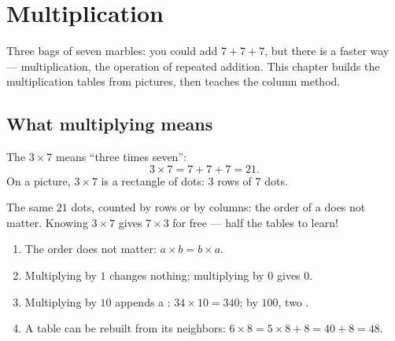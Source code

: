 \chapter{Multiplication}\label{ch:g3:mult}

Three bags of seven marbles: you could add $7 + 7 + 7$, but there is
a faster way --- multiplication, the operation of repeated addition.
This chapter builds the multiplication tables from pictures, then
teaches the column method.

\section{What multiplying means}

\begin{definition}[Multiplication]\label{def:g3:mult:def}
The  $3 \times 7$ means ``three times seven'':
\[
3 \times 7 = 7 + 7 + 7 = 21 .
\]
On a picture, $3 \times 7$ is a rectangle of dots: $3$ rows of $7$
dots.
\end{definition}

\begin{omfigure}

{\small The same $21$ dots, counted by rows or by columns: the order
of a  does not matter. Knowing $3 \times 7$ gives
$7 \times 3$ for free --- half the tables to learn!}
\end{omfigure}

\begin{proposition}[Rules that help]\label{prop:g3:mult:rules}
\begin{enumerate}
  \item The order does not matter: $a \times b = b \times a$.
  \item Multiplying by $1$ changes nothing; multiplying by $0$ gives
        $0$.
  \item Multiplying by $10$ appends a : $34 \times 10 = 340$;
        by $100$, two .
  \item A table can be rebuilt from its neighbors:
        $6 \times 8 = 5 \times 8 + 8 = 40 + 8 = 48$.
\end{enumerate}
\end{proposition}
\admitted

